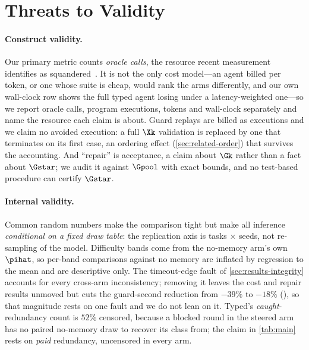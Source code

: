 \section{Threats to Validity}
\label{sec:threats}

\paragraph{Construct validity.}
Our primary metric counts \emph{oracle calls}, the resource recent measurement
identifies as squandered~\cite{lin2026run,chen2026rethinking}. It is not the
only cost model---an agent billed per token, or one whose suite is cheap, would
rank the arms differently, and our own wall-clock row shows the full typed
agent losing under a latency-weighted one---so we report oracle calls, program
executions, tokens and wall-clock separately and name the resource each claim
is about. Guard replays are billed as executions and we claim no avoided
execution: a full $\Xk$ validation is replaced by one that terminates on its
first case, an ordering effect (\cref{sec:related-order}) that survives the
accounting. And ``repair'' is acceptance, a claim about $\Gk$ rather than a
fact about $\Gstar$; we audit it against $\Gpool$ with exact bounds, and no
test-based procedure can certify $\Gstar$.

\paragraph{Internal validity.}
Common random numbers make the comparison tight but make all inference
\emph{conditional on a fixed draw table}: the replication axis is tasks
$\times$ seeds, not re-sampling of the model. Difficulty bands come from the
no-memory arm's own $\pihat$, so per-band comparisons against no memory are
inflated by regression to the mean and are descriptive only. The timeout-edge
fault of \cref{sec:results-integrity} accounts for every cross-arm
inconsistency; removing it leaves the cost and repair results unmoved but cuts
the guard-second reduction from $-39\%$ to $-18\%$
(), so that magnitude rests on one
fault and we do not lean on it. Typed's \emph{caught}-redundancy count is
$52\%$ censored, because a blocked round in the steered arm has no paired
no-memory draw to recover its class from; the claim in \cref{tab:main} rests on
\emph{paid} redundancy, uncensored in every arm.


